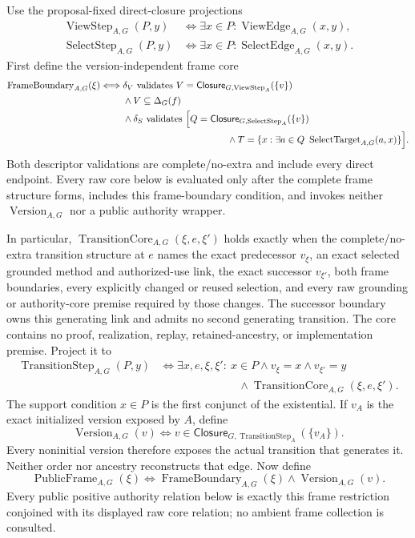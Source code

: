 \documentclass[11pt,twoside]{article}
\newcommand{\Closure}{\mathsf{Closure}}
\begin{document}
Use the proposal-fixed direct-closure projections
\[
\begin{aligned}
 \operatorname{ViewStep}_{A,G}(P,y)
 &\Longleftrightarrow
   \exists x\in P:\operatorname{ViewEdge}_{A,G}(x,y),\\
 \operatorname{SelectStep}_{A,G}(P,y)
 &\Longleftrightarrow
   \exists x\in P:\operatorname{SelectEdge}_{A,G}(x,y).
\end{aligned}
\]
First define the version-independent frame core
\[
\begin{split}
 \operatorname{FrameBoundary}_{A,G}(\xi)
 \Longleftrightarrow{}&
 \delta_V\text{ validates }
       V=\Closure_{G,\operatorname{ViewStep}_{A}}(\{v\})\\
 &{}\land V\subseteq\Delta_G(f)\\
 &{}\land \delta_S\text{ validates }
       \Bigl[
       Q=\Closure_{G,\operatorname{SelectStep}_{A}}(\{v\})\\
 &\hspace{11em}\land
       T=\{x:\exists a\in Q\
          \operatorname{SelectTarget}_{A,G}(a,x)\}
       \Bigr].
\end{split}
\]
Both descriptor validations are complete/no-extra and include every direct
endpoint.  Every raw core below is evaluated only after the complete frame
structure forms, includes this frame-boundary condition, and invokes neither
\(\operatorname{Version}_{A,G}\) nor a public authority wrapper.

In particular,
\(\operatorname{TransitionCore}_{A,G}(\xi,e,\xi')\) holds exactly when the
complete/no-extra transition structure at \(e\) names the exact predecessor
\(v_\xi\), an exact selected grounded method and authorized-use link, the exact
successor \(v_{\xi'}\), both frame boundaries, every explicitly changed or reused
selection, and every raw grounding or authority-core premise required by those
changes.  The successor boundary owns this generating link and admits no second
generating transition.  The core contains no proof, realization, replay,
retained-ancestry, or implementation premise.  Project it to
\[
\begin{aligned}
 \operatorname{TransitionStep}_{A,G}(P,y)
 &\Longleftrightarrow
   \exists x,e,\xi,\xi':\
   x\in P\land v_\xi=x\land v_{\xi'}=y\\[-0.2em]
 &\hspace{7em}\land
   \operatorname{TransitionCore}_{A,G}(\xi,e,\xi').
\end{aligned}
\]
The support condition \(x\in P\) is the first conjunct of the existential.
If \(v_A\) is the exact initialized version exposed by \(A\), define
\[
 \operatorname{Version}_{A,G}(v)
 \Longleftrightarrow
 v\in\Closure_{G,\operatorname{TransitionStep}_{A}}(\{v_A\}).
\]
Every noninitial version therefore exposes the actual transition that generates
it.  Neither order nor ancestry reconstructs that edge.
Now define
\[
 \operatorname{PublicFrame}_{A,G}(\xi)
 \Longleftrightarrow
 \operatorname{FrameBoundary}_{A,G}(\xi)
 \land\operatorname{Version}_{A,G}(v).
\]
Every public positive authority relation below is exactly this frame restriction
conjoined with its displayed raw core relation; no ambient frame collection is
consulted.
\end{document}
